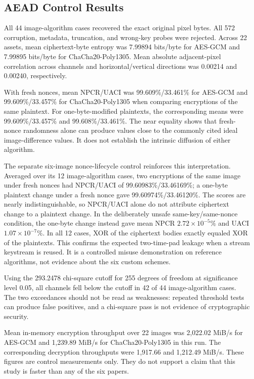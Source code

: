 \documentclass[letterpaper,journal]{IEEEtran}
\begin{document}
\subsection{AEAD Control Results}
All 44 image-algorithm cases recovered the exact original pixel bytes. All 572 corruption, metadata, truncation, and wrong-key probes were rejected. Across 22 assets, mean ciphertext-byte entropy was 7.99894 bits/byte for AES-GCM and 7.99895 bits/byte for ChaCha20-Poly1305. Mean absolute adjacent-pixel correlation across channels and horizontal/vertical directions was 0.00214 and 0.00240, respectively.

With fresh nonces, mean NPCR/UACI was 99.609\%/33.461\% for AES-GCM and 99.609\%/33.457\% for ChaCha20-Poly1305 when comparing encryptions of the same plaintext. For one-byte-modified plaintexts, the corresponding means were 99.609\%/33.457\% and 99.608\%/33.461\%. The near equality shows that fresh-nonce randomness alone can produce values close to the commonly cited ideal image-difference values. It does not establish the intrinsic diffusion of either algorithm.

The separate six-image nonce-lifecycle control reinforces this interpretation. Averaged over its 12 image-algorithm cases, two encryptions of the same image under fresh nonces had NPCR/UACI of 99.60983\%/33.46169\%; a one-byte plaintext change under a fresh nonce gave 99.60974\%/33.46120\%. The scores are nearly indistinguishable, so NPCR/UACI alone do not attribute ciphertext change to a plaintext change. In the deliberately unsafe same-key/same-nonce condition, the one-byte change instead gave mean NPCR $2.72\times10^{-5}\%$ and UACI $1.07\times10^{-7}\%$. In all 12 cases, XOR of the ciphertext bodies exactly equaled XOR of the plaintexts. This confirms the expected two-time-pad leakage when a stream keystream is reused. It is a controlled misuse demonstration on reference algorithms, not evidence about the six custom schemes.

Using the 293.2478 chi-square cutoff for 255 degrees of freedom at significance level 0.05, all channels fell below the cutoff in 42 of 44 image-algorithm cases. The two exceedances should not be read as weaknesses: repeated threshold tests can produce false positives, and a chi-square pass is not evidence of cryptographic security.

Mean in-memory encryption throughput over 22 images was 2,022.02 MiB/s for AES-GCM and 1,239.89 MiB/s for ChaCha20-Poly1305 in this run. The corresponding decryption throughputs were 1,917.66 and 1,212.49 MiB/s. These figures are control measurements only. They do not support a claim that this study is faster than any of the six papers.
\end{document}
